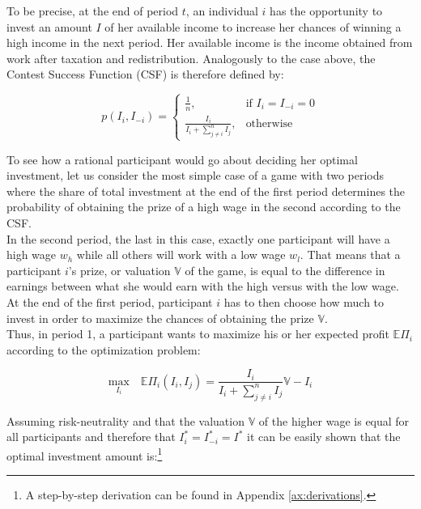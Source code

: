 To be precise, at the end of period $t$, an individual $i$ has the opportunity to invest an amount $I$ of her available income to increase her chances of winning a high income in the next period. Her available income is the income obtained from work after taxation and redistribution. Analogously to the case above, the Contest Success Function (CSF) is therefore defined by:

\begin{equation}
    p(I_i,I_{-i}) =
\begin{cases}
    \frac{1}{n},& \text{if } I_i = I_{-i} = 0\\
    \frac{I_i}{I_i + \sum_{j\neq i}^n I_{j}},              & \text{otherwise}
\end{cases}
\label{eq:csf}    
\end{equation}

\hfill \break

To see how a rational participant would go about deciding her optimal investment, let us consider the most simple case of a game with two periods where the share of total investment at the end of the first period determines the probability of obtaining the prize of a high wage in the second according to the CSF.\\

In the second period, the last in this case, exactly one participant will have a high wage $w_h$ while all others will work with a low wage $w_l$. That means that a participant $i$'s prize, or valuation $\mathbb{V}$ of the game, is equal to the difference in earnings between what she would earn with the high versus with the low wage. At the end of the first period, participant $i$ has to then choose how much to invest in order to maximize the chances of obtaining the prize $\mathbb{V}$.\\

Thus, in period 1, a participant wants to maximize his or her expected profit $\mathbb{E}\Pi_i$ according to the optimization problem:

\begin{equation}
    \underset{I_i}{\text{max}}\quad\mathbb{E}\Pi_i(I_i,I_j) = \frac{I_i}{I_i + \sum_{j\neq i}^n I_{j}}\mathbb{V} - I_i
\label{eq:exp_util}
\end{equation}

Assuming risk-neutrality and that the valuation $\mathbb{V}$ of the higher wage is equal for all participants and therefore that $I_i^{*}=I_{-i}^{*}=I^{*}$ it can be easily shown that the optimal investment amount is:\footnote{A step-by-step derivation can be found in Appendix \ref{ax:derivations}.}

